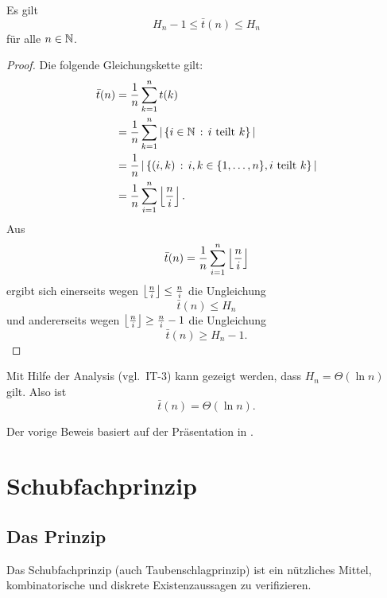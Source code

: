 \begin{thm}
	Es gilt
	\[
		 H_n - 1 \le \bar{t}(n) \le H_n 
	\]
	für alle $n \in \mathbb{N}$. 
\end{thm} 
\begin{proof}
	Die folgende Gleichungskette gilt:
	\begin{align*} 
		\bar{t} (n) & = \frac{1}{n} \sum_{k=1}^n t(k) 
		\\ & = \frac{1}{n} \sum_{k=1}^n | \setcond{i \in \N}{i \ \text{teilt} \ k}|
		\\ & = \frac{1}{n} \, | \setcond{(i,k)}{i,k \in \{1,\ldots,n\}, i \ \text{teilt}  \ k}|
		\\ & = \frac{1}{n} \sum_{i=1}^n \floor{ \frac{n}{i}}. 
	\end{align*}  
	Aus 
	\[
			\bar{t} (n) = \frac{1}{n} \sum_{i=1}^n \left\lfloor  \frac{n}{i} \right\rfloor
	\]
	ergibt sich einerseits wegen $\left\lfloor  \frac{n}{i} \right\rfloor \le \frac{n}{i}$ die Ungleichung 
	\[
			\bar{t}(n) \le H_n
	\]
	und andererseits wegen $\left\lfloor  \frac{n}{i}  \right\rfloor \ge \frac{n}{i} - 1$ die Ungleichung 
	\[
			\bar{t}(n) \ge H_n -1. 
	\]
\end{proof} 

\begin{bem}
	Mit Hilfe der Analysis (vgl.~IT-3) kann gezeigt werden, dass $H_n= \Theta(\ln n)$ gilt. Also ist 
	\[
		\bar{t}(n) = \Theta(\ln n). 
	\]
\end{bem} 

\begin{bem}
	Der vorige Beweis basiert auf der Präsentation in \cite[Kap.~25, Abs.~4]{AZ02}. 
\end{bem} 

\section{Schubfachprinzip} 

\subsection{Das Prinzip} 

\begin{bem}
	Das Schubfachprinzip (auch Taubenschlagprinzip) ist ein nützliches Mittel, kombinatorische und diskrete  Existenzaussagen zu verifizieren. 
\end{bem} 


